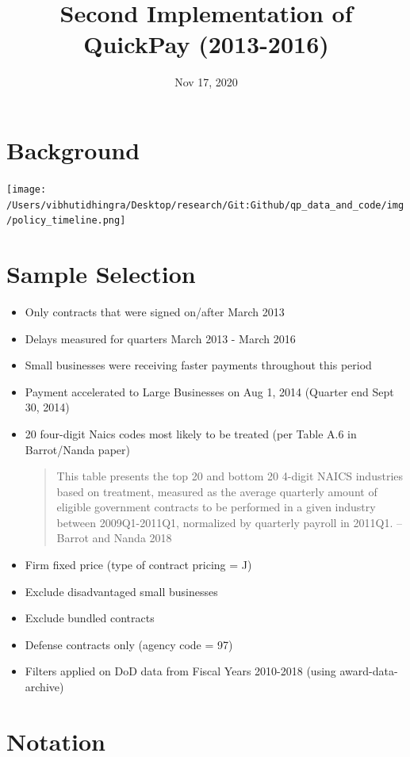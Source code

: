 \documentclass[
]{article}
\title{Second Implementation of QuickPay (2013-2016)}
\author{}
\date{\vspace{-2.5em}Nov 17, 2020}
\begin{document}
\maketitle

\hypertarget{background}{%
\section{Background}\label{background}}

\texttt{[image: /Users/vibhutidhingra/Desktop/research/Git:Github/qp\_data\_and\_code/img/policy\_timeline.png]}

\hypertarget{sample-selection}{%
\section{Sample Selection}\label{sample-selection}}

\begin{itemize}
\item
  Only contracts that were signed on/after March 2013
\item
  Delays measured for quarters March 2013 - March 2016
\item
  Small businesses were receiving faster payments throughout this period
\item
  Payment accelerated to Large Businesses on Aug 1, 2014 (Quarter end
  Sept 30, 2014)
\item
  20 four-digit Naics codes most likely to be treated (per Table A.6 in
  Barrot/Nanda paper)

  \begin{quote}
  This table presents the top 20 and bottom 20 4-digit NAICS industries
  based on treatment, measured as the average quarterly amount of
  eligible government contracts to be performed in a given industry
  between 2009Q1-2011Q1, normalized by quarterly payroll in 2011Q1. --
  Barrot and Nanda 2018
  \end{quote}
\item
  Firm fixed price (type of contract pricing = J)
\item
  Exclude disadvantaged small businesses
\item
  Exclude bundled contracts
\item
  Defense contracts only (agency code = 97)
\item
  Filters applied on DoD data from Fiscal Years 2010-2018 (using
  award-data-archive)
\end{itemize}

\hypertarget{notation}{%
\section{Notation}\label{notation}}
\end{document}
